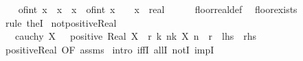 \begin{isabellebody}
\isanewline
{}\isamarkupfalse%
\isanewline
%
\isadelimproof
%
\endisadelimproof
%
\isatagproof
{}\isamarkupfalse%
\isanewline
\ \ \isamarkupfalse%
\ {\isachardoublequoteopen}of{\isacharunderscore}{\kern0pt}int\ {\isasymlfloor}x{\isasymrfloor}\ {\isasymle}\ x\ {\isasymand}\ x\ {\isacharless}{\kern0pt}\ of{\isacharunderscore}{\kern0pt}int\ {\isacharparenleft}{\kern0pt}{\isasymlfloor}x{\isasymrfloor}\ {\isacharplus}{\kern0pt}\ {}{\isacharparenright}{\kern0pt}{\isachardoublequoteclose}\ \ x\ {\isacharcolon}{\kern0pt}{\isacharcolon}{\kern0pt}\ real\isanewline
\ \ \ \ \isamarkupfalse%
\ floor{\isacharunderscore}{\kern0pt}real{\isacharunderscore}{\kern0pt}def\ \isamarkupfalse%
\ floor{\isacharunderscore}{\kern0pt}exists{}\ \isamarkupfalse%
\ {\isacharparenleft}{\kern0pt}rule\ theI{\isacharprime}{\kern0pt}{\isacharparenright}{\kern0pt}\isanewline
{}\isamarkupfalse%
%
\endisatagproof
{\isafoldproof}%
%
\isadelimproof
\isanewline
%
\endisadelimproof
\isanewline
{}\isamarkupfalse%
%
\isadelimdocument
%
\endisadelimdocument
%
\isatagdocument
%
\isamarkuptrue%
%
\endisatagdocument
{\isafolddocument}%
%
\isadelimdocument
%
\endisadelimdocument
{}\isamarkupfalse%
\ not{\isacharunderscore}{\kern0pt}positive{\isacharunderscore}{\kern0pt}Real{\isacharcolon}{\kern0pt}\ \isanewline
\ \ \ {\isachardoublequoteopen}cauchy\ X{\isachardoublequoteclose}\ \ {\isachardoublequoteopen}{\isasymnot}\ positive\ {\isacharparenleft}{\kern0pt}Real\ X{\isacharparenright}{\kern0pt}\ {\isasymlongleftrightarrow}\ {\isacharparenleft}{\kern0pt}{\isasymforall}r{\isachargreater}{\kern0pt}{}{\isachardot}{\kern0pt}\ {\isasymexists}k{\isachardot}{\kern0pt}\ {\isasymforall}n{\isasymge}k{\isachardot}{\kern0pt}\ X\ n\ {\isasymle}\ r{\isacharparenright}{\kern0pt}{\isachardoublequoteclose}\ {\isacharparenleft}{\kern0pt}\ {\isachardoublequoteopen}{\isacharquery}{\kern0pt}lhs\ {\isacharequal}{\kern0pt}\ {\isacharquery}{\kern0pt}rhs{\isachardoublequoteclose}{\isacharparenright}{\kern0pt}\isanewline
%
\isadelimproof
\ \ %
\endisadelimproof
%
\isatagproof
{}\isamarkupfalse%
\ positive{\isacharunderscore}{\kern0pt}Real\ {\isacharbrackleft}{\kern0pt}OF\ assms{\isacharbrackright}{\kern0pt}\isanewline
{}\isamarkupfalse%
\ {\isacharparenleft}{\kern0pt}intro\ iffI\ allI\ notI\ impI{\isacharparenright}{\kern0pt}\isanewline

\end{isabellebody}
